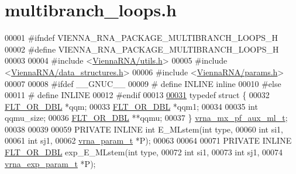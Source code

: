 \hypertarget{multibranch__loops_8h_source}{}\section{multibranch\+\_\+loops.\+h}
\label{multibranch__loops_8h_source}

\begin{DoxyCode}
00001 \textcolor{preprocessor}{#ifndef VIENNA\_RNA\_PACKAGE\_MULTIBRANCH\_LOOPS\_H}
00002 \textcolor{preprocessor}{#define VIENNA\_RNA\_PACKAGE\_MULTIBRANCH\_LOOPS\_H}
00003 
00004 \textcolor{preprocessor}{#include <\hyperlink{utils_8h}{ViennaRNA/utils.h}>}
00005 \textcolor{preprocessor}{#include <\hyperlink{data__structures_8h}{ViennaRNA/data\_structures.h}>}
00006 \textcolor{preprocessor}{#include <\hyperlink{params_8h}{ViennaRNA/params.h}>}
00007 
00008 \textcolor{preprocessor}{#ifdef \_\_GNUC\_\_}
00009 \textcolor{preprocessor}{# define INLINE inline}
00010 \textcolor{preprocessor}{#else}
00011 \textcolor{preprocessor}{# define INLINE}
00012 \textcolor{preprocessor}{#endif}
00013 
\hyperlink{group__loops}{00031} \textcolor{keyword}{typedef} \textcolor{keyword}{struct }\{
00032   \hyperlink{group__data__structures_ga31125aeace516926bf7f251f759b6126}{FLT\_OR\_DBL}  *qqm;
00033   \hyperlink{group__data__structures_ga31125aeace516926bf7f251f759b6126}{FLT\_OR\_DBL}  *qqm1;
00034 
00035   \textcolor{keywordtype}{int}         qqmu\_size;
00036   \hyperlink{group__data__structures_ga31125aeace516926bf7f251f759b6126}{FLT\_OR\_DBL}  **qqmu;
00037 \} \hyperlink{group__loops_structvrna__mx__pf__aux__ml__t}{vrna\_mx\_pf\_aux\_ml\_t};
00038 
00039 
00059 PRIVATE INLINE \textcolor{keywordtype}{int} E\_MLstem(\textcolor{keywordtype}{int}           type,
00060                             \textcolor{keywordtype}{int}           si1,
00061                             \textcolor{keywordtype}{int}           sj1,
00062                             \hyperlink{group__energy__parameters_structvrna__param__s}{vrna\_param\_t}  *P);
00063 
00064 
00071 PRIVATE INLINE \hyperlink{group__data__structures_ga31125aeace516926bf7f251f759b6126}{FLT\_OR\_DBL} exp\_E\_MLstem(\textcolor{keywordtype}{int}              type,
00072                                        \textcolor{keywordtype}{int}              si1,
00073                                        \textcolor{keywordtype}{int}              sj1,
00074                                        \hyperlink{group__energy__parameters_structvrna__exp__param__s}{vrna\_exp\_param\_t} *P);

\end{DoxyCode}

